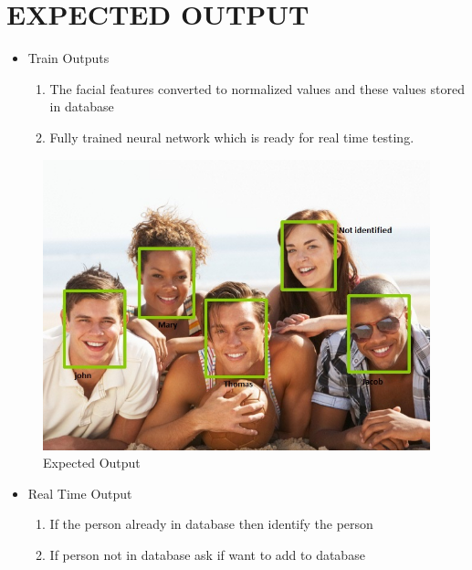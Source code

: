 \documentclass[11pt,a4paper,twoside]{report}
\begin{document}
\chapter{EXPECTED OUTPUT}
\begin{itemize}
\item Train Outputs
\begin{enumerate}
\item	The facial features converted to normalized values and these values stored in database
\item Fully trained neural network which is ready for real time testing.

\end{enumerate}
\end{itemize}
\begin{figure}[htpb]

\begin{center}
\includegraphics[scale=.5]{out}
\caption{Expected Output }
\end{center}

\end{figure}


\begin{itemize}
\item Real Time Output
\begin{enumerate}
\item If the person already in database then identify the person
\item If person not in database ask if want to add to database

\end{enumerate}

\end{itemize}
\end{document}
